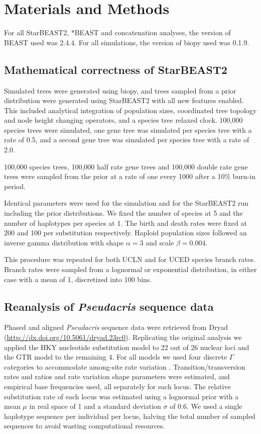 \documentclass[12pt]{article}
\begin{document}
\section{Materials and Methods}

For all StarBEAST2, *BEAST and concatenation analyses, the version of BEAST
used was 2.4.4. For all simulations, the version of biopy \citep{biopy} used
was 0.1.9.

\subsection{Mathematical correctness of StarBEAST2}

Simulated trees were generated using biopy, and trees sampled from a prior
distribution were generated using StarBEAST2 with all new features enabled.
This included analytical integration of population sizes, coordinated tree
topology and node height changing operators, and a species tree relaxed clock.
100,000 species trees were simulated, one gene tree was simulated per species
tree with a rate of 0.5, and a second gene tree was simulated per species tree
with a rate of 2.0.

100,000 species trees, 100,000 half rate gene trees and 100,000 double rate
gene trees were sampled from the prior at a rate of one every 1000 after a
10\% burn-in period.

Identical parameters were used for the simulation and for the StarBEAST2 run
including the prior distributions. We fixed the number of species at 5 and the
number of haplotypes per species at 1. The birth and death rates were fixed at
200 and 100 per substitution respectively. Haploid population sizes followed
an inverse gamma distribution with shape $\alpha = 3$ and scale $\beta =
0.004$.

This procedure was repeated for both UCLN and for UCED species branch rates.
Branch rates were sampled from a lognormal or exponential distribution, in
either case with a mean of 1, discretized into 100 bins.

\subsection{Reanalysis of \textit{Pseudacris} sequence data}

Phased and aligned \textit{Pseudacris} sequence data were retrieved from Dryad
(\url{http://dx.doi.org/10.5061/dryad.23rc0}). Replicating the original
analysis we applied the HKY nucleotide substitution model \citep{Hasegawa1985}
to 22 out of 26 nuclear loci and the GTR model \citep{Tavare1986} to the
remaining 4. For all models we used four discrete $\Gamma$ categories to
accommodate among-site rate variation \citep{Yang1994}. Transition/transversion
rates and ratios and rate variation shape parameters were estimated, and
empirical base frequencies used, all separately for each locus. The relative
substitution rate of each locus was estimated using a lognormal prior with a
mean $\mu$ in real space of 1 and a standard deviation $\sigma$ of 0.6. We
used a single haplotype sequence per individual per locus, halving the total
number of sampled sequences to avoid wasting computational resources.
\end{document}
